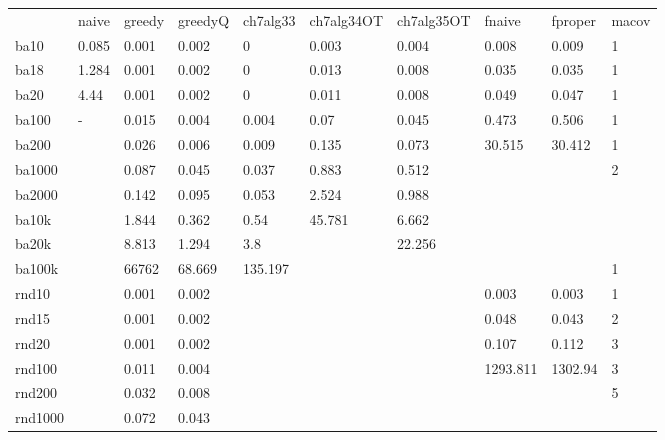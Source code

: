 \begin{landscape}
	\begin{table}[h]
		\centering
		\begin{tabular}{llllllllll}
			& naive & greedy & greedyQ & ch7alg33 & ch7alg34OT & ch7alg35OT & fnaive   & fproper & macov \\
			ba10    & 0.085 & 0.001  & 0.002   & 0        & 0.003      & 0.004      & 0.008    & 0.009   & 1     \\
			ba18    & 1.284 & 0.001  & 0.002   & 0        & 0.013      & 0.008      & 0.035    & 0.035   & 1     \\
			ba20    & 4.44  & 0.001  & 0.002   & 0        & 0.011      & 0.008      & 0.049    & 0.047   & 1     \\
			ba100   & -     & 0.015  & 0.004   & 0.004    & 0.07       & 0.045      & 0.473    & 0.506   & 1     \\
			ba200   &       & 0.026  & 0.006   & 0.009    & 0.135      & 0.073      & 30.515   & 30.412  & 1     \\
			ba1000  &       & 0.087  & 0.045   & 0.037    & 0.883      & 0.512      &          &         & 2     \\
			ba2000  &       & 0.142  & 0.095   & 0.053    & 2.524      & 0.988      &          &         &       \\
			ba10k   &       & 1.844  & 0.362   & 0.54     & 45.781     & 6.662      &          &         &       \\
			ba20k   &       & 8.813  & 1.294   & 3.8      &            & 22.256     &          &         &       \\
			ba100k  &       & 66762  & 68.669  & 135.197  &            &            &          &         & 1     \\
			rnd10   &       & 0.001  & 0.002   &          &            &            & 0.003    & 0.003   & 1     \\
			rnd15   &       & 0.001  & 0.002   &          &            &            & 0.048    & 0.043   & 2     \\
			rnd20   &       & 0.001  & 0.002   &          &            &            & 0.107    & 0.112   & 3     \\
			rnd100  &       & 0.011  & 0.004   &          &            &            & 1293.811 & 1302.94 & 3     \\
			rnd200  &       & 0.032  & 0.008   &          &            &            &          &         & 5     \\
			rnd1000 &       & 0.072  & 0.043   &          &            &            &          &         &       \\

\end{tabular}
\end{table}
\end{landscape}
